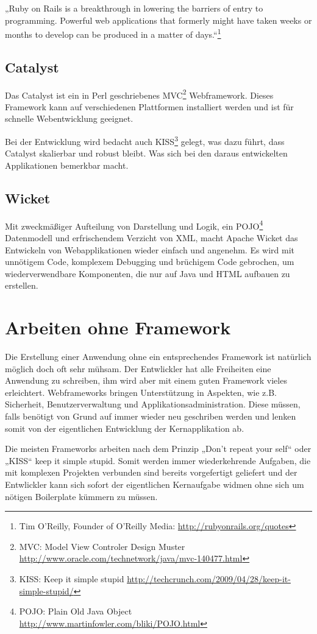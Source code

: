 „Ruby on Rails is a breakthrough in lowering the barriers of entry to
programming. Powerful web applications that formerly might have taken weeks or 
months to develop can be produced in a matter of days.“\footnote{Tim O'Reilly,
Founder of O'Reilly Media: \url{http://rubyonrails.org/quotes} }

\subsection{Catalyst}
Das Catalyst ist ein in Perl geschriebenes  MVC\footnote{MVC: Model View
Controler Design Muster
\url{http://www.oracle.com/technetwork/java/mvc-140477.html}} Webframework. 
Dieses Framework kann auf verschiedenen Plattformen installiert werden und ist 
für schnelle Webentwicklung geeignet.\cite{catalystperlnet}

Bei der Entwicklung wird bedacht auch KISS\footnote{KISS: Keep it simple
stupid \url{http://techcrunch.com/2009/04/28/keep-it-simple-stupid/}} gelegt,
was dazu führt, dass Catalyst skalierbar und robust bleibt. Was sich bei den 
daraus entwickelten Applikationen bemerkbar macht.\cite{catalystframework}

\subsection{Wicket}
Mit zweckmäßiger Aufteilung von Darstellung und Logik, ein POJO\footnote{POJO: Plain Old Java
Object \url{http://www.martinfowler.com/bliki/POJO.html}} Datenmodell und
erfrischendem Verzicht von XML, macht Apache Wicket das Entwickeln von
Webapplikationen wieder einfach und angenehm. Es wird mit unnötigem Code,
komplexem Debugging und brüchigem Code gebrochen, um wiederverwendbare
Komponenten, die nur auf Java und HTML aufbauen zu erstellen.\cite{wicket}

\section{Arbeiten ohne Framework}
Die Erstellung einer Anwendung ohne ein entsprechendes Framework ist
natürlich möglich doch oft sehr mühsam. Der Entwlickler hat alle Freiheiten eine
Anwendung zu schreiben, ihm wird aber mit einem guten Framework vieles
erleichtert. Webframeworks bringen Unterstützung in Aspekten, wie z.B.
Sicherheit, Benutzerverwaltung und Applikationsadministration. Diese müssen, 
falls benötigt von Grund auf immer wieder neu geschriben werden und lenken
somit von der eigentlichen Entwicklung der Kernapplikation ab. 

Die meisten Frameworks arbeiten nach dem Prinzip „Don't repeat your self“ oder 
„KISS“ keep it simple stupid. Somit werden immer wiederkehrende Aufgaben, die 
mit komplexen Projekten verbunden sind bereits vorgefertigt geliefert und der 
Entwlickler kann sich sofort der eigentlichen Kernaufgabe widmen ohne
sich um nötigen Boilerplate kümmern zu müssen.


